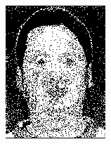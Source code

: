 \begin{figure}[h]
\begin{subfigure}[b]{0.18\textwidth}
         \includegraphics[width=\textwidth]{images/results/base_st/dd121.color.d3_bayes.png}
     \end{subfigure}
    \hfill
     \begin{subfigure}[b]{0.18\textwidth}
         \centering

\end{subfigure}
\end{figure}

